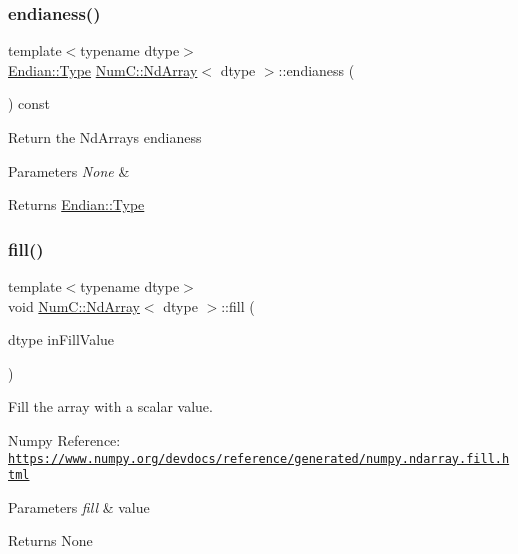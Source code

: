 \subsubsection{\texorpdfstring{endianess()}{endianess()}}
{\footnotesize\ttfamily template$<$typename dtype$>$ \\
\mbox{\hyperlink{struct_num_c_1_1_endian_ab667001489f67f8a96f328f0a9c351fa}{Endian\+::\+Type}} \mbox{\hyperlink{class_num_c_1_1_nd_array}{Num\+C\+::\+Nd\+Array}}$<$ dtype $>$\+::endianess (\begin{DoxyParamCaption}{ }\end{DoxyParamCaption}) const\hspace{0.3cm}{\ttfamily [inline]}}

Return the Nd\+Arrays endianess


\begin{DoxyParams}{Parameters}
{\em None} & \\
\hline
\end{DoxyParams}
\begin{DoxyReturn}{Returns}
\mbox{\hyperlink{struct_num_c_1_1_endian_ab667001489f67f8a96f328f0a9c351fa}{Endian\+::\+Type}} 
\end{DoxyReturn}
\mbox{\label{class_num_c_1_1_nd_array_aa2fe95342a32bcf98b7961499b2e4378}} 
\subsubsection{\texorpdfstring{fill()}{fill()}}
{\footnotesize\ttfamily template$<$typename dtype$>$ \\
void \mbox{\hyperlink{class_num_c_1_1_nd_array}{Num\+C\+::\+Nd\+Array}}$<$ dtype $>$\+::fill (\begin{DoxyParamCaption}\item[{dtype}]{in\+Fill\+Value }\end{DoxyParamCaption})\hspace{0.3cm}{\ttfamily [inline]}}

Fill the array with a scalar value.

Numpy Reference\+: \href{https://www.numpy.org/devdocs/reference/generated/numpy.ndarray.fill.html}{\tt https\+://www.\+numpy.\+org/devdocs/reference/generated/numpy.\+ndarray.\+fill.\+html}


\begin{DoxyParams}{Parameters}
{\em fill} & value \\
\hline
\end{DoxyParams}
\begin{DoxyReturn}{Returns}
None 
\end{DoxyReturn}
\mbox{\label{class_num_c_1_1_nd_array_a37128bae07c734f4f9edce7265f67ff0}} 
